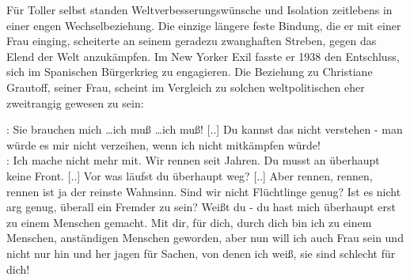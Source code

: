 Für Toller selbst standen Weltverbesserungswünsche und Isolation 
zeitlebens in einer engen Wechselbeziehung. Die einzige längere feste
Bindung, die er mit einer Frau einging, scheiterte an seinem geradezu
zwanghaften Streben, gegen das Elend der Welt anzukämpfen. Im New Yorker Exil
fasste er 1938 den Entschluss, sich im Spanischen Bürgerkrieg zu engagieren. Die
Beziehung zu Christiane Grautoff, seiner Frau, scheint im Vergleich zu solchen
weltpolitischen  eher zweitrangig gewesen zu sein:

\label{grautoff}
\begin{BlockQuote}
: Sie brauchen mich \ldots ich muß \ldots ich muß! [..] 
Du kannst das nicht verstehen - man würde es mir nicht verzeihen, wenn ich
nicht mitkämpfen würde!\\
: Ich mache nicht mehr mit. Wir rennen seit
Jahren. Du musst an überhaupt keine Front. [..] Vor was läufst du überhaupt
weg? [..] Aber rennen, rennen, rennen ist ja der reinste Wahnsinn. Sind wir
nicht Flüchtlinge genug? Ist es nicht arg genug, überall ein Fremder zu sein?
Weißt du - du hast mich überhaupt erst zu einem Menschen gemacht. Mit dir,
für dich, durch dich bin ich zu einem Menschen, anständigen Menschen
geworden, aber nun will ich auch Frau sein und nicht nur hin und her jagen
für Sachen, von denen ich weiß, sie sind schlecht für
dich!
\end{BlockQuote}



